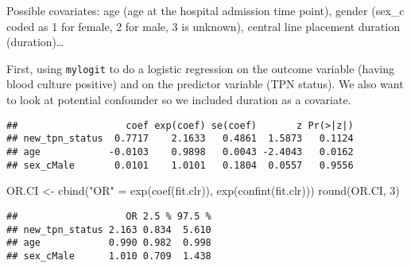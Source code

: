\documentclass[
]{article}
\newenvironment{Shaded}{\begin{snugshade}}{\end{snugshade}}
\newcommand{\AttributeTok}[1]{\textcolor[rgb]{0.77,0.63,0.00}{#1}}
\newcommand{\DecValTok}[1]{\textcolor[rgb]{0.00,0.00,0.81}{#1}}
\newcommand{\FunctionTok}[1]{\textcolor[rgb]{0.00,0.00,0.00}{#1}}
\newcommand{\NormalTok}[1]{#1}
\newcommand{\OtherTok}[1]{\textcolor[rgb]{0.56,0.35,0.01}{#1}}
\newcommand{\SpecialCharTok}[1]{\textcolor[rgb]{0.00,0.00,0.00}{#1}}
\newcommand{\StringTok}[1]{\textcolor[rgb]{0.31,0.60,0.02}{#1}}
\begin{document}
Possible covariates: age (age at the hospital admission time point),
gender (sex\_c coded as 1 for female, 2 for male, 3 is unknown), central
line placement duration (duration)\ldots{}

First, using \texttt{mylogit} to do a logistic regression on the outcome
variable (having blood culture positive) and on the predictor variable
(TPN status). We also want to look at potential confounder so we
included duration as a covariate.

\begin{Shaded}
\end{Shaded}

\begin{verbatim}
##                   coef exp(coef) se(coef)       z Pr(>|z|)
## new_tpn_status  0.7717    2.1633   0.4861  1.5873   0.1124
## age            -0.0103    0.9898   0.0043 -2.4043   0.0162
## sex_cMale       0.0101    1.0101   0.1804  0.0557   0.9556
\end{verbatim}

\begin{Shaded}
\begin{Highlighting}[]
\NormalTok{OR.CI }\OtherTok{\textless{}{-}} \FunctionTok{cbind}\NormalTok{(}\StringTok{"OR"} \OtherTok{=} \FunctionTok{exp}\NormalTok{(}\FunctionTok{coef}\NormalTok{(fit.clr)),}
               \FunctionTok{exp}\NormalTok{(}\FunctionTok{confint}\NormalTok{(fit.clr)))}
\FunctionTok{round}\NormalTok{(OR.CI, }\DecValTok{3}\NormalTok{)}
\end{Highlighting}
\end{Shaded}

\begin{verbatim}
##                   OR 2.5 % 97.5 %
## new_tpn_status 2.163 0.834  5.610
## age            0.990 0.982  0.998
## sex_cMale      1.010 0.709  1.438
\end{verbatim}
\end{document}
